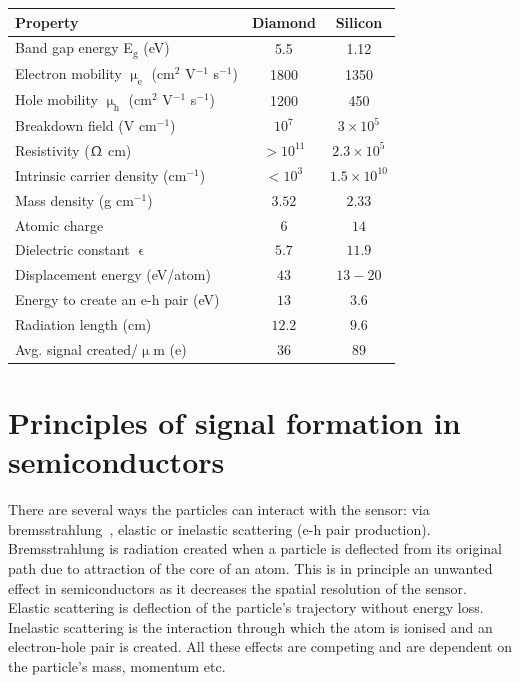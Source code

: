 \begin{footnotesize}
\begin{center}
\begin{tabular}{   l  c  c   }
\hline
Property & Diamond & Silicon \\
\hline
Band gap energy E$_\mathrm{g}$ (eV) & 5.5 & 1.12  \\
Electron mobility $\upmu_\mathrm{e}$ (cm$^2$ V$^{-1}$ s$^{-1}$) & 1800 & 1350 \\
Hole mobility $\upmu_\mathrm{h}$ (cm$^2$ V$^{-1}$ s$^{-1}$) & 1200 & 450 \\
Breakdown field (V cm$^{-1}$) & $10^{7}$ & $3\times 10^5$ \\
Resistivity ($\Upomega$ cm) & $>10^{11}$  & $2.3\times 10^5$  \\
Intrinsic carrier density (cm$^{-1}$) & $<10^3$ & $1.5\times 10^{10} $ \\
Mass density (g cm$^{-1}$) & $ 3.52$ & $2.33 $ \\
Atomic charge  & $6 $ & $ 14$ \\
Dielectric constant $\upvarepsilon$ & $5.7 $ & $11.9 $ \\
Displacement energy (eV/atom) & $43 $ & $13-20 $ \\
Energy to create an e-h pair  (eV) & $13 $ & $ 3.6$ \\
Radiation length (cm) & $ 12.2$ & $9.6 $ \\
Avg. signal created/$\upmu$m (e) & 36 & 89 \\\hline
\end{tabular}
\label{tab:semicompare}
\end{center}
\end{footnotesize}


\section{Principles of signal formation in semiconductors}
\label{sec:princsigfor}
There are several ways the particles can interact with the sensor: via bremsstrahlung~\cite{}, elastic or inelastic scattering (e-h pair production). Bremsstrahlung is radiation created when a particle is deflected from its original path due to attraction of the core of an atom. This is in principle an unwanted effect in semiconductors as it decreases the spatial resolution of the sensor. Elastic scattering is deflection of the particle's trajectory without energy loss. Inelastic scattering is the interaction through which the atom is ionised and an electron-hole pair is created. All these effects are competing and are dependent on the particle's mass, momentum etc. 

